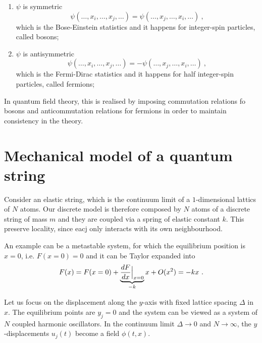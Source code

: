     \begin{enumerate}
        \item $\psi$ is symmetric 
            \begin{equation*}
                \psi(\ldots, x_i, \ldots, x_j, \ldots) = \psi(\ldots, x_j, \ldots, x_i, \ldots) ~,
             \end{equation*}
            which is the Bose-Einstein statistics and it happens for integer-spin particles, called bosons;
        \item $\psi$ is antisymmetric 
            \begin{equation*}
                \psi(\ldots, x_i, \ldots, x_j, \ldots) = - \psi(\ldots, x_j, \ldots, x_i, \ldots) ~,
             \end{equation*}
            which is the Fermi-Dirac statistics and it happens for half integer-spin particles, called fermions;
    \end{enumerate}
    In quantum field theory, this is realised by imposing commutation relations fo bosons and anticommutation relations for fermions in order to maintain consistency in the theory.

\chapter{Mechanical model of a quantum string}

    Consider an elastic string, which is the continuum limit of a $1$-dimensional lattics of $N$ atoms. Our discrete model is therefore composed by $N$ atoms of a discrete string of mass $m$ and they are coupled via a spring of elastic constant $k$. This preserve locality, since eacj only interacts with its own neighbourhood. 

    An example can be a metastable system, for which the equilibrium position is $x = 0$, i.e. $F(x = 0) = 0$ and it can be Taylor expanded into 
    \begin{equation}
        F(x) = F(x = 0) + \underbrace{\frac{dF}{dx} \Big \vert_{x = 0}}_{-k} x + O(x^2) = - k x ~.
    \end{equation}

    Let us focus on the displacement along the $y$-axis with fixed lattice spacing $\Delta$ in $x$. The equilibrium points are $y_j = 0$ and the system can be viewed as a system of $N$ coupled harmonic oscillators. In the continuum limit $\Delta \rightarrow 0$ and $ N \rightarrow \infty$, the $y$-displacements $u_j (t)$ become a field $\phi(t, x)$.

